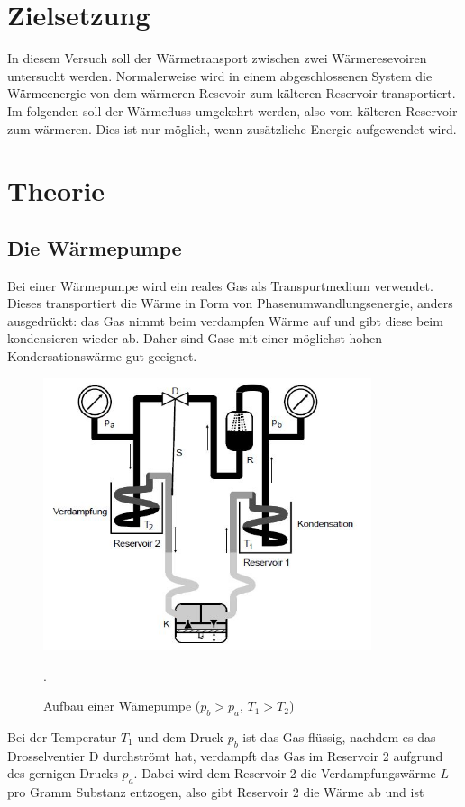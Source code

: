 
\section{Zielsetzung}
In diesem Versuch soll der Wärmetransport zwischen zwei Wärmeresevoiren untersucht werden.
Normalerweise wird in einem abgeschlossenen System die Wärmeenergie von dem wärmeren Resevoir zum
kälteren Reservoir transportiert. Im folgenden soll der Wärmefluss umgekehrt werden, also vom
kälteren Reservoir zum wärmeren. Dies ist nur möglich, wenn zusätzliche Energie
aufgewendet wird.

\section{Theorie}
\subsection{Die Wärmepumpe}
Bei einer Wärmepumpe wird ein reales Gas als Transpurtmedium verwendet. Dieses transportiert die
Wärme in Form von Phasenumwandlungsenergie, anders ausgedrückt: das Gas nimmt beim
verdampfen Wärme auf und gibt diese beim kondensieren wieder ab.
Daher sind Gase mit einer möglichst hohen Kondersationswärme gut geeignet.
\begin{figure}[H]
  \centering
  \includegraphics[height=8cm]{Pumpe.JPG}
  \caption{Aufbau einer Wämepumpe ($p_{b}>p_{a}$, $T_{1}>T_{2}$)}
  \cite{skript}.
  \label{fig:pumpe}
\end{figure}
Bei der Temperatur $T_{1}$ und dem Druck $p_{b}$ ist das Gas flüssig, nachdem es das Drosselventier D durchströmt
hat, verdampft das Gas im Reservoir 2 aufgrund des gernigen Drucks $p_{a}$. Dabei wird dem
Reservoir 2 die Verdampfungswärme $L$ pro Gramm Substanz entzogen, also gibt Reservoir 2 die Wärme ab und ist
